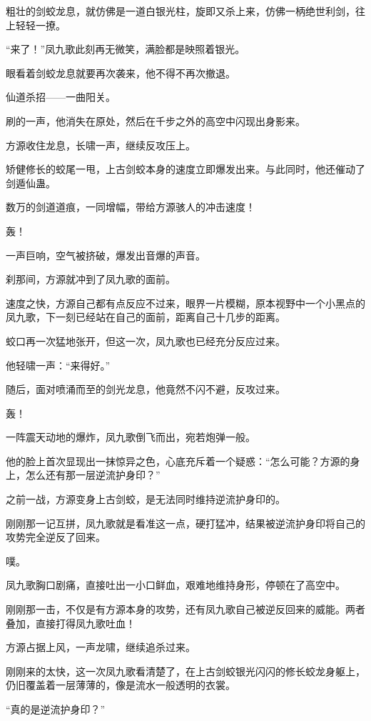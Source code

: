 \begin{this_body}
粗壮的剑蛟龙息，就仿佛是一道白银光柱，旋即又杀上来，仿佛一柄绝世利剑，往上轻轻一撩。

“来了！”凤九歌此刻再无微笑，满脸都是映照着银光。

眼看着剑蛟龙息就要再次袭来，他不得不再次撤退。

仙道杀招——一曲阳关。

刷的一声，他消失在原处，然后在千步之外的高空中闪现出身影来。

方源收住龙息，长啸一声，继续反攻压上。

矫健修长的蛟尾一甩，上古剑蛟本身的速度立即爆发出来。与此同时，他还催动了剑遁仙蛊。

数万的剑道道痕，一同增幅，带给方源骇人的冲击速度！

轰！

一声巨响，空气被挤破，爆发出音爆的声音。

刹那间，方源就冲到了凤九歌的面前。

速度之快，方源自己都有点反应不过来，眼界一片模糊，原本视野中一个小黑点的凤九歌，下一刻已经站在自己的面前，距离自己十几步的距离。

蛟口再一次猛地张开，但这一次，凤九歌也已经充分反应过来。

他轻啸一声：“来得好。”

随后，面对喷涌而至的剑光龙息，他竟然不闪不避，反攻过来。

轰！

一阵震天动地的爆炸，凤九歌倒飞而出，宛若炮弹一般。

他的脸上首次显现出一抹惊异之色，心底充斥着一个疑惑：“怎么可能？方源的身上，怎么还有那一层逆流护身印？”

之前一战，方源变身上古剑蛟，是无法同时维持逆流护身印的。

刚刚那一记互拼，凤九歌就是看准这一点，硬打猛冲，结果被逆流护身印将自己的攻势完全逆反了回来。

噗。

凤九歌胸口剧痛，直接吐出一小口鲜血，艰难地维持身形，停顿在了高空中。

刚刚那一击，不仅是有方源本身的攻势，还有凤九歌自己被逆反回来的威能。两者叠加，直接打得凤九歌吐血！

方源占据上风，一声龙啸，继续追杀过来。

刚刚来的太快，这一次凤九歌看清楚了，在上古剑蛟银光闪闪的修长蛟龙身躯上，仍旧覆盖着一层薄薄的，像是流水一般透明的衣裳。

“真的是逆流护身印？”


\end{this_body}
